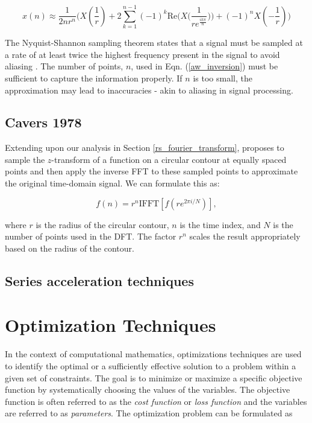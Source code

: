 \documentclass[a4paper]{report}
\begin{document}
\begin{equation}\label{aw_inversion}
	x(n) \approx \frac{1}{2nr^n} \biggr( X(\frac{1}{r}) + 2\sum^{n-1}_{k = 1} (-1)^k \text{Re}\bigg( X\big(\frac{1}{re^{\frac{ik\pi}{n}}}\big)\bigg) + (-1)^nX(-\frac{1}{r}) \biggl)
\end{equation}

The Nyquist-Shannon sampling theorem states that a signal must be sampled at a rate of at least twice the highest frequency present in the signal to avoid aliasing \citep{shannon1949communication,nyquist1928certain}. The number of points, $n$, used in Eqn. (\ref{aw_inversion}) must be sufficient to capture the information properly. If $n$ is too small, the approximation may lead to inaccuracies - akin to aliasing in signal processing.

\subsection{Cavers 1978}\label{cavers_section}
Extending upon our analysis in Section \ref{rs_fourier_transform}, \citet{Cavers1978FFT} proposes to sample the $z$-transform of a function on a circular contour at equally spaced points and then apply the inverse FFT to these sampled points to approximate the original time-domain signal. We can formulate this as:

\begin{equation}\label{cavers}
	f(n) = r^n \text{IFFT}[f(re^{2\pi i / N})],
\end{equation}

where $r$ is the radius of the circular contour, $n$ is the time index, and $N$ is the number of points used in the DFT. The factor $r^n$ scales the result appropriately based on the radius of the contour.

\subsection{Series acceleration techniques}

\section{Optimization Techniques}
In the context of computational mathematics, optimizations techniques are used to identify the optimal or a sufficiently effective solution to a problem within a given set of constraints. The goal is to minimize or maximize a specific objective function by systematically choosing the values of the variables. The objective function is often referred to as the \textit{cost function} or \textit{loss function} and the variables are referred to as \textit{parameters}. The optimization problem can be formulated as
\end{document}

